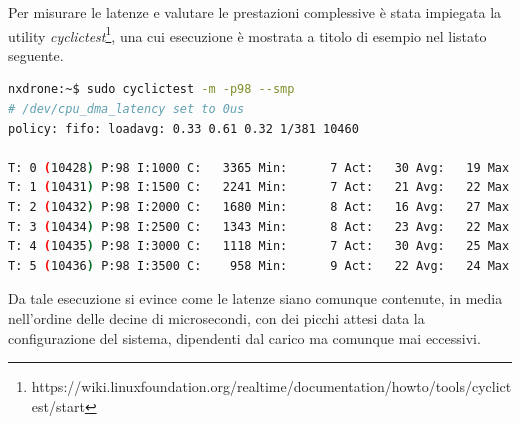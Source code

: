 Per misurare le latenze e valutare le prestazioni complessive è stata impiegata la utility \emph{cyclictest}\footnote{https://wiki.linuxfoundation.org/realtime/documentation/howto/tools/cyclictest/start}, una cui esecuzione è mostrata a titolo di esempio nel listato seguente.
\vspace{1cm}
\begin{lstlisting}[language=bash, caption=Esempio di benchmark del SoC montato sul drone eseguito con la utility \emph{cyclictest}.]
nxdrone:~$ sudo cyclictest -m -p98 --smp
# /dev/cpu_dma_latency set to 0us
policy: fifo: loadavg: 0.33 0.61 0.32 1/381 10460          

T: 0 (10428) P:98 I:1000 C:   3365 Min:      7 Act:   30 Avg:   19 Max:     147
T: 1 (10431) P:98 I:1500 C:   2241 Min:      7 Act:   21 Avg:   22 Max:     294
T: 2 (10432) P:98 I:2000 C:   1680 Min:      8 Act:   16 Avg:   27 Max:     352
T: 3 (10434) P:98 I:2500 C:   1343 Min:      8 Act:   23 Avg:   22 Max:     155
T: 4 (10435) P:98 I:3000 C:   1118 Min:      7 Act:   30 Avg:   25 Max:     147
T: 5 (10436) P:98 I:3500 C:    958 Min:      9 Act:   22 Avg:   24 Max:     319
\end{lstlisting}

Da tale esecuzione si evince come le latenze siano comunque contenute, in media nell'ordine delle decine di microsecondi, con dei picchi attesi data la configurazione del sistema, dipendenti dal carico ma comunque mai eccessivi.
\clearpage

